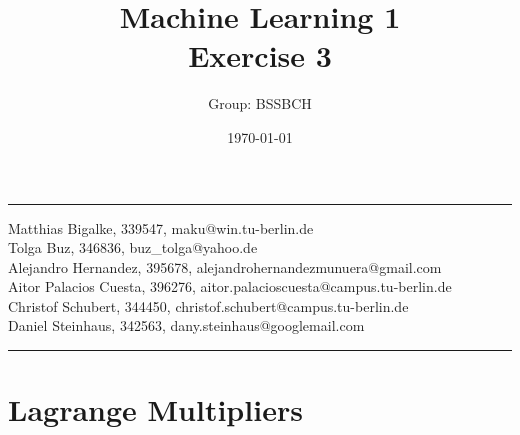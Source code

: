 \documentclass{article}
\title{Machine Learning 1 \\ Exercise 3} %
\author{Group: BSSBCH} %
\date{\today} %
\begin{document}
\maketitle %
\noindent\rule[0.5ex]{\linewidth}{1pt}
Matthias Bigalke, 339547, maku@win.tu-berlin.de \\
Tolga Buz, 346836, buz\_tolga@yahoo.de \\
Alejandro Hernandez, 395678, alejandrohernandezmunuera@gmail.com \\
Aitor Palacios Cuesta, 396276, aitor.palacioscuesta@campus.tu-berlin.de \\
Christof Schubert, 344450, christof.schubert@campus.tu-berlin.de \\
Daniel Steinhaus, 342563, dany.steinhaus@googlemail.com\\
\noindent\rule[0.5ex]{\linewidth}{1pt}


\section{Lagrange Multipliers}
\end{document}
